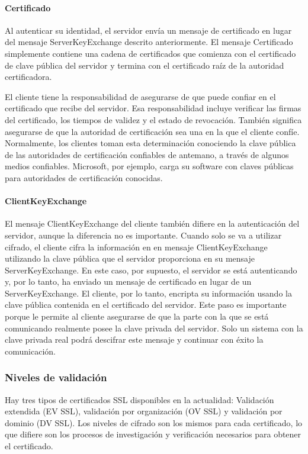 \paragraph*{Certificado}
Al autenticar su identidad, el servidor envía un mensaje de certificado 
en lugar del mensaje ServerKeyExchange descrito anteriormente. El mensaje 
Certificado simplemente contiene una cadena de certificados que comienza 
con el certificado de clave pública del servidor y termina con el certificado 
raíz de la autoridad certificadora.

El cliente tiene la responsabilidad de asegurarse de que puede confiar 
en el certificado que recibe del servidor. Esa responsabilidad incluye 
verificar las firmas del certificado, los tiempos de validez y el estado 
de revocación. También significa asegurarse de que la autoridad de 
certificación sea una en la que el cliente confíe. Normalmente, los clientes 
toman esta determinación conociendo la clave pública de las autoridades de 
certificación confiables de antemano, a través de algunos medios confiables. 
Microsoft, por ejemplo, carga su software con claves públicas para 
autoridades de certificación conocidas.

\paragraph*{ClientKeyExchange}
El mensaje ClientKeyExchange del cliente también difiere en la autenticación 
del servidor, aunque la diferencia no es importante. Cuando solo se va a 
utilizar cifrado, el cliente cifra la información en en mensaje 
ClientKeyExchange 
utilizando la clave pública que el servidor proporciona en su mensaje 
ServerKeyExchange. En este caso, por supuesto, el servidor se está 
autenticando y, por lo tanto, ha enviado un mensaje de certificado en 
lugar de un ServerKeyExchange. El cliente, por lo tanto, encripta su 
información usando la clave pública contenida en el 
certificado del servidor. Este paso es importante porque le permite 
al cliente asegurarse de que la parte con la que se está comunicando 
realmente posee la clave privada del servidor. Solo un sistema con la 
clave privada real podrá descifrar este mensaje y continuar con éxito 
la comunicación.

 

\subsubsection*{Niveles de validación}
Hay tres tipos de certificados SSL disponibles en la actualidad: Validación extendida 
(EV SSL), validación por organización (OV SSL) y validación por dominio (DV SSL). 
Los niveles de cifrado son los mismos para cada certificado, lo que difiere son los 
procesos de investigación y verificación necesarios para obtener el certificado.

